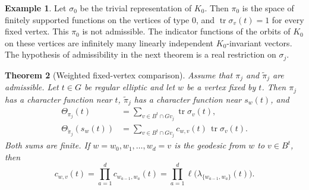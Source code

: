 \documentclass[12pt,letterpaper]{article}
\numberwithin{equation}{section}
\newtheorem{theorem}{Theorem}[section]
\theoremstyle{definition}
\newtheorem{example}[theorem]{Example}
\theoremstyle{remark}
\newcommand{\tr}{\operatorname{tr}}
\begin{document}
\begin{example}
Let $\sigma_0$ be the trivial representation of $K_0$. Then $\pi_0$ is the space of finitely supported functions on the vertices of type $0$, and $\tr\sigma_v(t)=1$ for every fixed vertex. This $\pi_0$ is not admissible. The indicator functions of the orbits of $K_0$ on these vertices are infinitely many linearly independent $K_0$-invariant vectors. The hypothesis of admissibility in the next theorem is a real restriction on $\sigma_j$.
\end{example}

\begin{theorem}[Weighted fixed-vertex comparison]\label{thm:weighted}
Assume that $\pi_j$ and $\widetilde\pi_j$ are admissible. Let $t\in G$ be regular elliptic and let $w$ be a vertex fixed by $t$. Then $\pi_j$ has a character function near $t$, $\widetilde\pi_j$ has a character function near $s_w(t)$, and
\begin{align}
 \Theta_{\pi_j}(t)&=\sum_{v\in B^t\cap Gv_j}\tr\sigma_v(t),\label{eq:ordinary}\\
 \Theta_{\widetilde\pi_j}(s_w(t))
 &=\sum_{v\in B^t\cap Gv_j}
 c_{w,v}(t)\,\tr\sigma_v(t).\label{eq:weighted}
\end{align}
Both sums are finite. If $w=w_0,w_1,\ldots,w_d=v$ is the geodesic from $w$ to $v\in B^t$, then
\begin{equation}\label{eq:path}
 c_{w,v}(t)=\prod_{a=1}^{d}c_{w_{a-1},w_a}(t)
 =\prod_{a=1}^{d}\ell\bigl(\lambda_{\{w_{a-1},w_a\}}(t)\bigr).
\end{equation}
\end{theorem}
\end{document}
